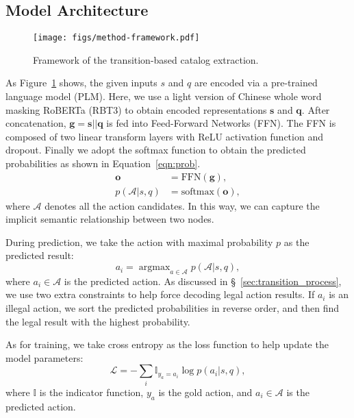 \documentclass[runningheads]{llncs}
\DeclareMathOperator*{\argmax}{argmax}
\begin{document}
\subsection{Model Architecture}

\begin{figure}[t]
    \centering
    \texttt{[image: figs/method-framework.pdf]}
    \caption{Framework of the transition-based catalog extraction.}
    \label{fig:tracer_framework}
\end{figure}

As Figure~\ref{fig:tracer_framework} shows, the given inputs $s$ and $q$ are encoded via a pre-trained language model (PLM).
Here, we use a light version of Chinese whole word masking RoBERTa (RBT3) \cite{cui-bert-wwm} to obtain encoded representations $\boldsymbol{s}$ and $\boldsymbol{q}$.
After concatenation, $\boldsymbol{g} = \boldsymbol{s} || \boldsymbol{q}$ is fed into Feed-Forward Networks (FFN).
The FFN is composed of two linear transform layers with ReLU activation function and dropout.
Finally we adopt the softmax function to obtain the predicted probabilities as shown in Equation~\ref{eqn:prob}.
\begin{align}
\label{eqn:prob}
    \boldsymbol{o} &= \textrm{FFN}(\boldsymbol{g}), \nonumber\\
p(\mathcal{A}|s,q) &= \textrm{softmax}(\boldsymbol{o}),
\end{align}
where $\mathcal{A}$ denotes all the action candidates. In this way, we can capture the implicit semantic relationship between two nodes.

During prediction, we take the action with maximal probability $p$ as the predicted result:
\begin{equation}
    \nonumber
a_i = \argmax_{a\in\mathcal{A}} p(\mathcal{A}|s,q),
\end{equation}
where $a_i \in \mathcal{A}$ is the predicted action.
As discussed in \S~\ref{sec:transition_process}, we use two extra constraints to help force decoding legal action results.
If $a_i$ is an illegal action, we sort the predicted probabilities in reverse order, and then find the legal result with the highest probability.

As for training, we take cross entropy as the loss function to help update the model parameters:
\begin{equation}
    \nonumber
    \mathcal{L} = -\sum_i \mathbb{I}_{y_a = a_i} \log p(a_i|s, q),
\end{equation}
where $\mathbb{I}$ is the indicator function, $y_a$ is the gold action, and $a_i \in \mathcal{A}$ is the predicted action.
\end{document}
